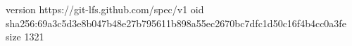 version https://git-lfs.github.com/spec/v1
oid sha256:69a3c5d3e8b047b48e27b795611b898a55ec2670bc7dfc1d50c16f4b4cc0a3fe
size 1321
